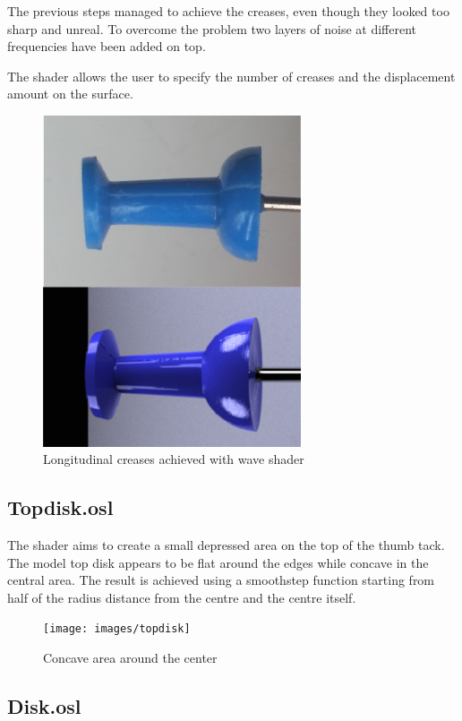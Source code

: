 \documentclass[tog]{acmsiggraph}
\begin{document}
The previous steps managed to achieve the creases, even though they looked too sharp and unreal. To overcome the problem two layers of noise at different frequencies have been added on top.

The shader allows the user to specify the number of creases and the displacement amount on the surface.

\begin{figure}[ht]
  \centering
  \includegraphics[width=3.0in]{images/wave}
  \caption{Longitudinal creases achieved with wave shader}
  \label{fig:wave}
\end{figure}

\subsection{Topdisk.osl}

The shader aims to create a small depressed area on the top of the thumb tack. The model top disk appears to be flat around the edges while concave in the central area. The result is achieved using a smoothstep function starting from half of the radius distance from the centre and the centre itself.

\begin{figure}[h!]
  \centering
  \texttt{[image: images/topdisk]}
  \caption{Concave area around the center}
  \label{fig:topdisk}
\end{figure}

\newpage
\subsection{Disk.osl}
\end{document}
